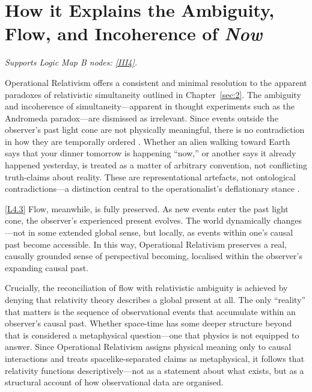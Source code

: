 \documentclass[12pt]{book}
\newcounter{logicanchor}
\newenvironment{logicanchorenv}[1]{\refstepcounter{logicanchor}\label{#1}}{}
\newcommand{\logiclink}[2]{\begin{logicanchorenv}{logic:#1}\end{logicanchorenv}\hyperref[appendix:#1]{[#1]}\xspace}
\begin{document}
\section[How it Explains Relativistic Ambiguity, Flow, and Incoherence]{How it Explains the Ambiguity, Flow, and Incoherence of \textit{Now}}\label{sec:4.2}
\noindent\textit{Supports Logic Map B nodes: \hyperref[appendix:III4]{[III4]}.}

\vspace{4pt}

Operational Relativism offers a consistent and minimal resolution to the apparent paradoxes of relativistic simultaneity outlined in Chapter~\ref{sec:2}. The ambiguity and incoherence of simultaneity---apparent in thought experiments such as the Andromeda paradox---are dismissed as irrelevant. Since events outside the observer's past light cone are not physically meaningful, there is no contradiction in how they are temporally ordered \citep{Salmon1969, Sklar1974}. Whether an alien walking toward Earth says that your dinner tomorrow is happening ``now,'' or another says it already happened yesterday, is treated as a matter of arbitrary convention, not conflicting truth-claims about reality. These are representational artefacts, not ontological contradictions---a distinction central to the operationalist's deflationary stance \citep[cf.][]{Maudlin2007}.

\logiclink{L4.3}{} Flow, meanwhile, is fully preserved. As new events enter the past light cone, the observer's experienced present evolves. The world dynamically changes---not in some extended global sense, but locally, as events within one's causal past become accessible. In this way, Operational Relativism preserves a real, causally grounded sense of perspectival becoming, localised within the observer's expanding causal past.

Crucially, the reconciliation of flow with relativistic ambiguity is achieved by denying that relativity theory describes a global present at all. The only ``reality'' that matters is the sequence of observational events that accumulate within an observer's causal past. Whether space-time has some deeper structure beyond that is considered a metaphysical question---one that physics is not equipped to answer. Since Operational Relativism assigns physical meaning only to causal interactions and treats spacelike-separated claims as metaphysical, it follows that relativity functions descriptively---not as a statement about what exists, but as a structural account of how observational data are organised.
\end{document}
